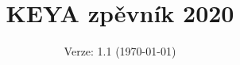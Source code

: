 \documentclass[twoside,12pt,a5paper]{article}
\title{KEYA zpěvník 2020}
\date{Verze: 1.1 (\today)}
\begin{document}
\maketitle
\cleardoublepage
\begin{multicols}{2}
\begin{footnotesize}
\tableofcontents{}
\end{footnotesize}
\end{multicols}
\clearpage

\end{document}
